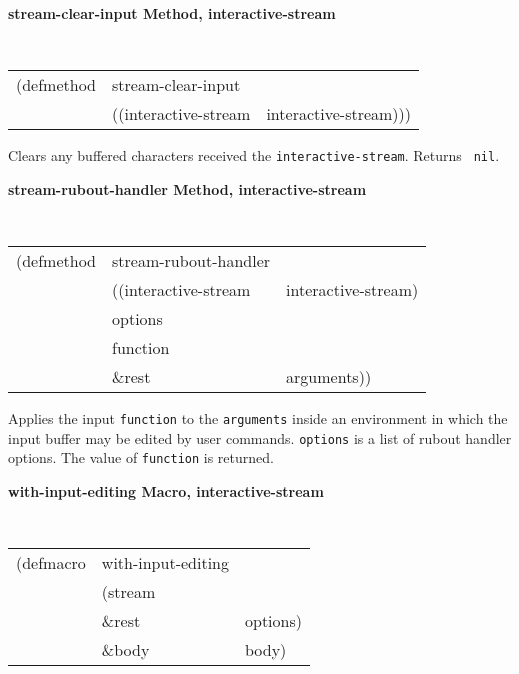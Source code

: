 {\samepage
{\large {\bf stream-clear-input \hfill Method, interactive-stream}}
\begin{flushright} \parbox[t]{6.125in}{
\tt
\begin{tabular}{lll}
\raggedright
(defmethod & stream-clear-input & \\
& ((interactive-stream  &interactive-stream)))
\end{tabular}
\rm

}\end{flushright}}

\begin{flushright} \parbox[t]{6.125in}{
Clears any buffered characters received the {\tt interactive-stream}. Returns {\tt
nil}.
 
}
\end{flushright}

{\samepage
{\large {\bf stream-rubout-handler \hfill Method, interactive-stream}}
\begin{flushright} \parbox[t]{6.125in}{
\tt
\begin{tabular}{lll}
\raggedright
(defmethod & stream-rubout-handler & \\
& ((interactive-stream  &interactive-stream)\\
& options\\
& function\\
&\&rest & arguments))
\end{tabular}
\rm

}\end{flushright}}

\begin{flushright} \parbox[t]{6.125in}{
Applies the input {\tt function} to the {\tt arguments} inside an environment in
which the input buffer may be edited by user commands. {\tt options} is a list of rubout
handler options. The value of {\tt function} is returned.
 
}
\end{flushright}

{\samepage
{\large {\bf with-input-editing \hfill Macro, interactive-stream}}
\begin{flushright} \parbox[t]{6.125in}{
\tt
\begin{tabular}{lll}
\raggedright
(defmacro & with-input-editing & \\
& (stream \\
& \&rest & options)\\
& \&body  & body)
\end{tabular}
\rm

}\end{flushright}}

